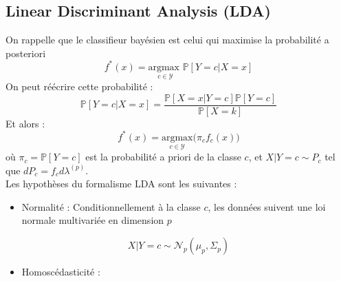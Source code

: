 \documentclass[a4paper,11pt]{paper}
\theoremstyle{plain}
\theoremstyle{definition}
\theoremstyle{remark}
\begin{document}
\subsection{Linear Discriminant Analysis (LDA)}

On rappelle que le classifieur bayésien est celui qui maximise la probabilité a posteriori
$$f^*(x) = \underset{c \in \mathcal Y}{\text{argmax }} \mathbb P[Y =c | X= x]$$
On peut réécrire cette probabilité :
$$\mathbb P[Y = c| X=x ] = \dfrac{\mathbb P[X = x | Y = c] \mathbb P[Y = c]}{\mathbb P[X = k]}$$
Et alors :
$$f^*(x) = \underset{c \in \mathcal Y}{\text{argmax}}\big( \pi_c f_c(x)\big)$$
où $\pi_c = \mathbb P[Y =c]$ est la probabilité a priori de la classe $c$, et $X | Y = c \sim P_c$ tel que $dP_c = f_c d\lambda ^{(p)}$.  \\
Les hypothèses du formalisme LDA sont les suivantes :
\begin{itemize}
    \item Normalité : Conditionnellement à la classe $c$, les données suivent une loi normale multivariée en dimension $p$
\end{itemize}
$$X | Y = c \sim \mathcal N_p(\mu_p, \Sigma_p)$$
\begin{itemize}
    \item Homoscédasticité :
\end{itemize}
\end{document}
